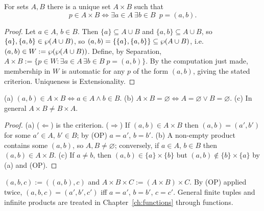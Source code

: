 \begin{theorem}\label{thm:product}
	For sets $A,B$ there is a unique set $A\times B$ such that
	\[
	p\in A\times B\iff\exists a\in A\ \exists b\in B\ \;p=(a,b).
	\]
\end{theorem}
\begin{proof}
	Let $a\in A$, $b\in B$. Then $\{a\}\subseteq A\cup B$ and $\{a,b\}\subseteq A\cup B$, so $\{a\},\{a,b\}\in\wp(A\cup B)$, so $(a,b)=\{\{a\},\{a,b\}\}\subseteq\wp(A\cup B)$, i.e.\ $(a,b)\in W:=\wp(\wp(A\cup B))$. Define, by Separation, $A\times B:=\{p\in W:\exists a\in A\,\exists b\in B\;p=(a,b)\}$. By the computation just made, membership in $W$ is automatic for any $p$ of the form $(a,b)$, giving the stated criterion. Uniqueness is Extensionality.
\end{proof}

\begin{proposition}\label{prop:product-basic}
	(a) $(a,b)\in A\times B\iff a\in A\wedge b\in B$. (b) $A\times B=\varnothing\iff A=\varnothing\vee B=\varnothing$. (c) In general $A\times B\ne B\times A$.
\end{proposition}
\begin{proof}
	(a) ($\Leftarrow$) is the criterion. ($\Rightarrow$) If $(a,b)\in A\times B$ then $(a,b)=(a',b')$ for some $a'\in A$, $b'\in B$; by (OP) $a=a'$, $b=b'$. (b) A non-empty product contains some $(a,b)$, so $A,B\ne\varnothing$; conversely, if $a\in A$, $b\in B$ then $(a,b)\in A\times B$. (c) If $a\ne b$, then $(a,b)\in\{a\}\times\{b\}$ but $(a,b)\notin\{b\}\times\{a\}$ by (a) and (OP).
\end{proof}

\begin{definition}[Triples]
	$(a,b,c):=((a,b),c)$ and $A\times B\times C:=(A\times B)\times C$. By (OP) applied twice, $(a,b,c)=(a',b',c')$ iff $a=a'$, $b=b'$, $c=c'$. General finite tuples and infinite products are treated in Chapter~\ref{ch:functions} through functions.
\end{definition}